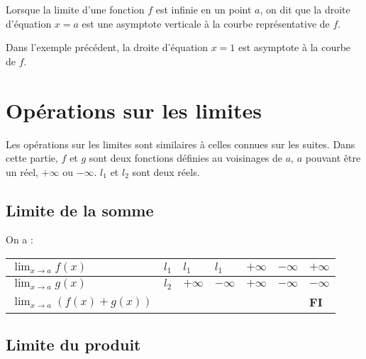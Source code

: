 \documentclass[11pt,fleqn, openany]{book} %
\begin{document}
\begin{definition}Lorsque la limite d'une fonction $f$ est infinie en un point $a$, on dit que la droite d'équation $x=a$ est une asymptote verticale à la courbe représentative de $f$.\end{definition}

\begin{example} Dans l'exemple précédent, la droite d'équation $x=1$ est asymptote à la courbe de $f$.\end{example}


\section{Opérations sur les limites}

Les opérations sur les limites sont similaires à celles connues sur les suites. Dans cette partie, $f$ et $g$ sont deux fonctions définies au voisinages de $a$, $a$ pouvant être un réel, $+\infty$ ou $-\infty$. $l_1$ et $l_2$ sont deux réels.

\subsection{Limite de la somme}

\begin{proposition} On a :

\begin{center}
\begin{tabularx}{\linewidth}{|l|X|X|X|X|X|X|}
\hline
$\displaystyle \lim_{x \to a} f(x)$ & $l_1$ & $l_1$ & $l_1$ & $+\infty$ & $-\infty$ & $ +\infty$\\
\hline
$\displaystyle \lim_{x \to a} g(x)$ & $l_2$ & $+\infty$ & $-\infty$ & $+\infty$ & $-\infty$ & $-\infty$ \\
\hline
$\displaystyle \lim_{x \to a} (f(x)+g(x))$ &  &  &  &  &   & \textbf{FI}\\
\hline
\end{tabularx}
\end{center}\end{proposition}

\newpage


\subsection{Limite du produit}
\end{document}
